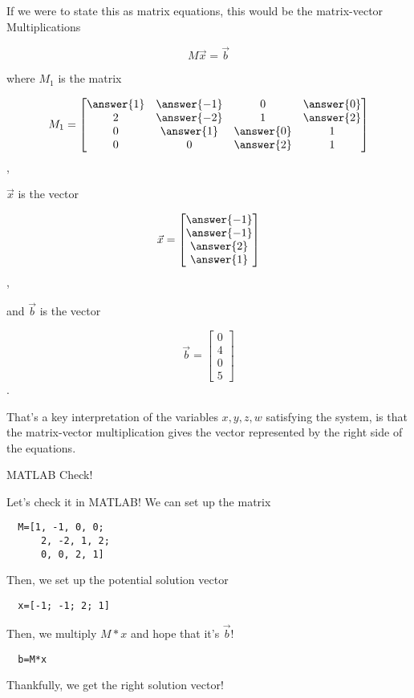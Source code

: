 \documentclass{ximera}
\begin{document}
If we were to state this as matrix equations, this would be the matrix-vector Multiplications

$$M\vec{x}=\vec{b}$$

where $M_1$ is the matrix 

\begin{equation}
  M_1=\begin{bmatrix}
    \answer{1} & \answer{-1} & 0 & \answer{0} \\
    2 & \answer{-2} & 1 & \answer{2} \\
    0 & \answer{1}  & \answer{0} & 1 \\
    0 & 0  & \answer{2} & 1 \\
  \end{bmatrix}
\end{equation},

$\vec{x}$ is the vector

\begin{equation}
  \vec{x}=\begin{bmatrix}
    \answer{-1} \\
    \answer{-1}  \\
    \answer{2} \\
    \answer{1}  
  \end{bmatrix}
\end{equation},

and $\vec{b}$ is the vector

\begin{equation}
  \vec{b}=\begin{bmatrix}
    0 \\
    4  \\
    0 \\
    5  
  \end{bmatrix}
\end{equation}.

That's a key interpretation of the variables $x, y, z, w$ satisfying the system, is that the matrix-vector multiplication gives the vector represented by the right side of the equations.

\begin{remark}{MATLAB Check!}

  Let's check it in MATLAB! We can set up the matrix 

  \begin{verbatim}
  M=[1, -1, 0, 0;
      2, -2, 1, 2;
      0, 0, 2, 1]
  \end{verbatim}

  Then, we set up the potential solution vector 

  \begin{verbatim}
  x=[-1; -1; 2; 1]
  \end{verbatim}

  Then, we multiply $M*x$ and hope that it's $\vec{b}$!

  \begin{verbatim}
  b=M*x
  \end{verbatim}

  Thankfully, we get the right solution vector!

\end{remark}
\end{document}
